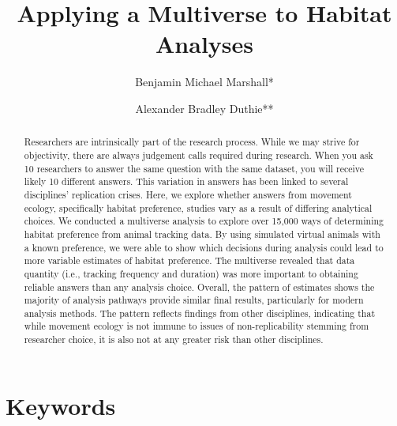\documentclass[10pt,a4paper]{article}
\begin{document}
\pagestyle{fancy}

\title{Applying a Multiverse to Habitat Analyses}
\author[1]{Benjamin Michael Marshall*}
\author[1]{Alexander Bradley Duthie**}


\maketitle
\thispagestyle{fancy}

\begin{abstract}

Researchers are intrinsically part of the research process. While we may strive for objectivity, there are always judgement calls required during research. When you ask 10 researchers to answer the same question with the same dataset, you will receive likely 10 different answers. This variation in answers has been linked to several disciplines' replication crises. Here, we explore whether answers from movement ecology, specifically habitat preference, studies vary as a result of differing analytical choices. We conducted a multiverse analysis to explore over 15,000 ways of determining habitat preference from animal tracking data. By using simulated virtual animals with a known preference, we were able to show which decisions during analysis could lead to more variable estimates of habitat preference. The multiverse revealed that data quantity (i.e., tracking frequency and duration) was more important to obtaining reliable answers than any analysis choice. Overall, the pattern of estimates shows the majority of analysis pathways provide similar final results, particularly for modern analysis methods. The pattern reflects findings from other disciplines, indicating that while movement ecology is not immune to issues of non-replicability stemming from researcher choice, it is also not at any greater risk than other disciplines.

\end{abstract}

\section*{Keywords}
\end{document}
